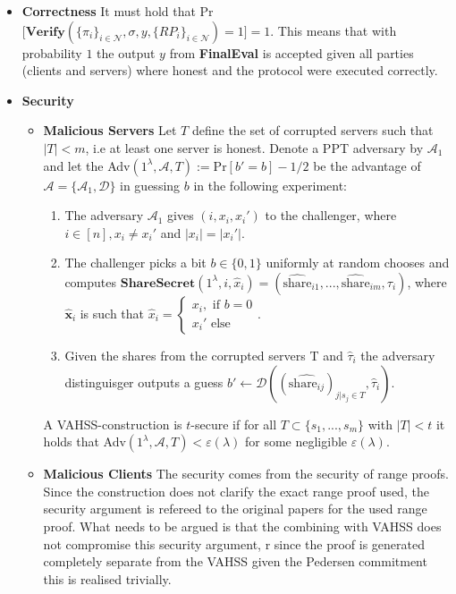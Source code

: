 \begin{itemize}
    \item \textbf{Correctness} It must hold that Pr$\Big[\textbf{Verify}(\{\pi_i\}_{i\in\mathcal{N}},\sigma,y,\{RP_i\}_{i\in\mathcal{N}})=1\Big]=1$. This means that 					with probability $1$ the output $y$ from \textbf{FinalEval} is accepted given all parties (clients and servers) where honest and the protocol were executed correctly.
    \item \textbf{Security} 
    			\begin{itemize}
    						\item \textbf{Malicious Servers } Let $T$ define the set of corrupted servers such that $|T|<m$, i.e at 					least one server is honest.  										Denote a PPT adversary by $\mathcal{A}_1$ and let the Adv$(1^			\lambda,\mathcal{A},T):= \text{Pr}[b' = b]-1/2$ be the advantage 										of $\mathcal{A}=\{\mathcal{A}_1,\mathcal{D}\}$ in guessing $b$ in the following experiment:
    									\begin{enumerate}
       										 \item The adversary $\mathcal{A}_1$ gives $(i,x_i,x_i')$ to the challenger, where $i\in[n], x_i\neq x_i'$ and $|x_i|=|x_i'|$.
        										\item The challenger picks a bit $b\in\{0,1\}$ uniformly at random chooses and computes $\textbf{ShareSecret}(1^\lambda,i,																\hat{x}_i) = (\hat{\text{share}}_{i1},...,\hat{\text{share}}_{im},\tau_i)$, where $\hat{\textbf{x}}_i$ is  such that $\hat{x}_i = 																\begin{cases}x_i, \text{ if } b=0 \\ x_i' \text{ else} \end{cases}$. 
        										\item Given the shares from the corrupted servers T and $\hat{\tau}_i$ the adversary distinguisger outputs a guess 																			$b'\xleftarrow[]{}\mathcal{D}((\hat{\text{share}_{ij}})_{j|s_j\in T},\hat{\tau}_i)$.
   									 \end{enumerate}
    									A VAHSS-construction is $t$-secure if for all $T\subset \{s_1,...,s_m\}$ with $|T|<t$ it holds that Adv$(1^\lambda,\mathcal{A},T)<												\varepsilon(\lambda)$ for some negligible $\varepsilon(\lambda)$.
  					  \item \textbf{Malicious Clients}  The security  comes from the security of range proofs. Since the construction does not clarify the exact range proof used, the security argument is refereed to the original papers for the used range proof. What needs to be argued is that the combining with VAHSS does not compromise this security argument, r since the proof is generated completely separate from the VAHSS given the Pedersen commitment this is realised trivially. 

\end{itemize}
\end{itemize}
